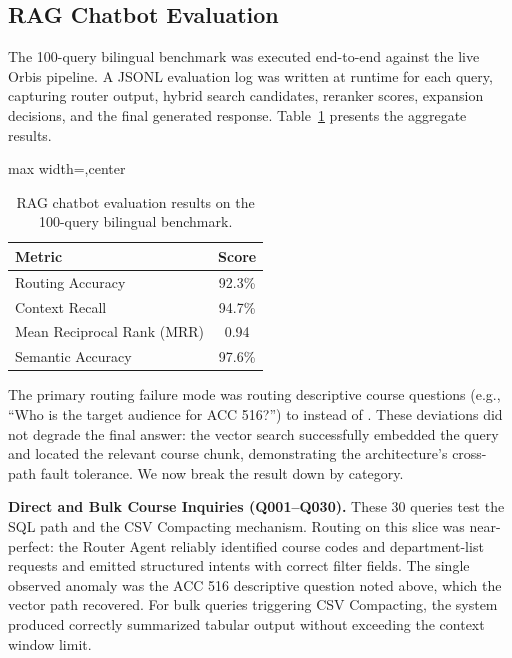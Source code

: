 \documentclass[a4paper,12pt]{article}
\renewcommand{\texttt}[1]{{\ttfamily\seqsplit{#1}}}
\begin{document}
\subsection{RAG Chatbot Evaluation}
\label{sec:rag_eval}
The 100-query bilingual benchmark was executed end-to-end against the live Orbis pipeline. A JSONL evaluation log was written at runtime for each query, capturing router output, hybrid search candidates, reranker scores, expansion decisions, and the final generated response. Table~\ref{tab:rag_results} presents the aggregate results.

\begin{table}[H]
    \centering
    \begin{adjustbox}{max width=\linewidth,center}
        \begin{tabular}{l c}
            \toprule
            \textbf{Metric} & \textbf{Score} \\ \midrule
            Routing Accuracy                & 92.3\% \\
            Context Recall                  & 94.7\% \\
            Mean Reciprocal Rank (MRR)      & 0.94 \\
            Semantic Accuracy               & 97.6\% \\
            \bottomrule
        \end{tabular}
    \end{adjustbox}
    \caption[RAG Chatbot Evaluation Results]{RAG chatbot evaluation results on the 100-query bilingual benchmark.}
    \label{tab:rag_results}
\end{table}

The primary routing failure mode was routing descriptive course questions (e.g., ``Who is the target audience for ACC 516?'') to \texttt{vector} instead of \texttt{sql}. These deviations did not degrade the final answer: the vector search successfully embedded the query and located the relevant course chunk, demonstrating the architecture's cross-path fault tolerance. We now break the result down by category.

\textbf{Direct and Bulk Course Inquiries (Q001--Q030).} These 30 queries test the SQL path and the CSV Compacting mechanism. Routing on this slice was near-perfect: the Router Agent reliably identified course codes and department-list requests and emitted structured \texttt{sql} intents with correct filter fields. The single observed anomaly was the ACC 516 descriptive question noted above, which the vector path recovered. For bulk queries triggering CSV Compacting, the system produced correctly summarized tabular output without exceeding the context window limit.
\end{document}
